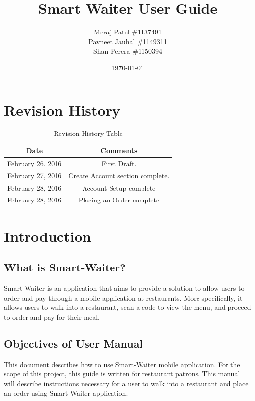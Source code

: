 \documentclass[12pt, titlepage]{article}
\begin{document}
\title{Smart Waiter User Guide} 
\author{Meraj Patel \#1137491 \\ Pavneet Jauhal \#1149311\\ Shan Perera \#1150394}
\date{\today}
\maketitle

\tableofcontents 

\listoffigures

\listoftables

\begin{table}[H]
\section*{Revision History}
\begin{tabular}{|c|c|}
\hline
\textbf{Date}  & \textbf{Comments} \\ \hline
February 26, 2016 &  First Draft. \\ 
\hline
February 27, 2016 & Create Account section complete. \\
\hline
February 28, 2016 & Account Setup complete \\
\hline
February 28, 2016 & Placing an Order complete \\
\hline
\end{tabular}
\caption{Revision History Table}
\end{table}



\section{Introduction}

\subsection{What is Smart-Waiter?}
Smart-Waiter is an application that aims to provide a solution to allow users to order and pay through a mobile application at restaurants. More specifically, it allows users to walk into a restaurant, scan a code to view the menu, and proceed to order and pay for their meal.
\subsection{Objectives of User Manual}
This document describes how to use Smart-Waiter mobile application. For the scope of this project, this guide is written for restaurant patrons. This manual will describe instructions necessary for a user to walk into a restaurant and place an order using Smart-Waiter application. 
\end{document}
